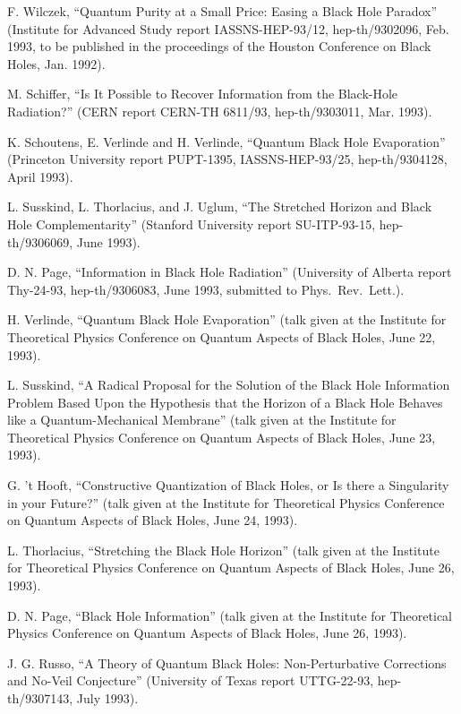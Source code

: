 \documentclass[12pt]{article}
\begin{document}
\begin{thebibliography}{999}
 F. Wilczek, ``Quantum Purity at a Small Price: Easing a
Black
Hole Paradox'' (Institute for Advanced Study report IASSNS-HEP-93/12,
hep-th/9302096, Feb. 1993, to be published in the proceedings of the
Houston
Conference on Black Holes, Jan. 1992).

 M. Schiffer, ``Is It Possible to Recover
Information
from the Black-Hole Radiation?'' (CERN report CERN-TH 6811/93,
hep-th/9303011, Mar. 1993).

 K. Schoutens, E. Verlinde and H. Verlinde, ``Quantum
Black
Hole
Evaporation'' (Princeton University report PUPT-1395,
IASSNS-HEP-93/25,
hep-th/9304128, April 1993).

 L. Susskind, L. Thorlacius, and J. Uglum, ``The
Stretched
Horizon and Black Hole Complementarity'' (Stanford University report
SU-ITP-93-15, hep-th/9306069, June 1993).

 D. N. Page, ``Information in Black Hole Radiation''
(University of Alberta report Thy-24-93, hep-th/9306083, June 1993,
submitted to Phys.\ Rev.\ Lett.).

 H. Verlinde, ``Quantum Black Hole Evaporation''
(talk given at the Institute for Theoretical Physics Conference on
Quantum Aspects of Black Holes, June 22, 1993).

 L. Susskind, ``A Radical Proposal for the Solution
of the Black Hole Information Problem Based Upon the Hypothesis
that the Horizon of a Black Hole Behaves like a
Quantum-Mechanical Membrane''
(talk given at the Institute for Theoretical Physics Conference
on Quantum Aspects of Black Holes, June 23, 1993).

 G. 't Hooft, ``Constructive Quantization of
Black Holes, or Is there a Singularity in your Future?''
(talk given at the Institute for Theoretical Physics Conference
on Quantum Aspects of Black Holes, June 24, 1993).

 L. Thorlacius, ``Stretching the Black Hole Horizon''
(talk given at the Institute for Theoretical Physics Conference
on Quantum Aspects of Black Holes, June 26, 1993).

 D. N. Page, ``Black Hole Information''
(talk given at the Institute for Theoretical Physics Conference
on Quantum Aspects of Black Holes, June 26, 1993).

 J. G. Russo, ``A Theory of Quantum Black Holes:
Non-Perturbative Corrections and No-Veil Conjecture''
(University of Texas report UTTG-22-93, hep-th/9307143, July 1993).


\end{thebibliography}
\end{document}
